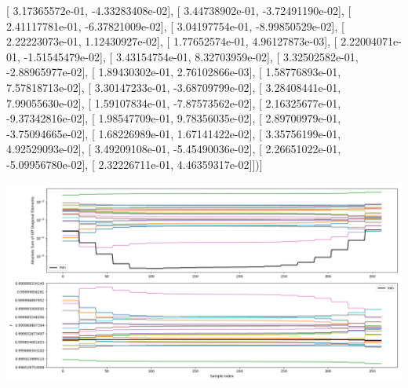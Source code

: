\documentclass{article}
\begin{document}
       [  3.17365572e-01,  -4.33283408e-02],
       [  3.44738902e-01,  -3.72491190e-02],
       [  2.41117781e-01,  -6.37821009e-02],
       [  3.04197754e-01,  -8.99850529e-02],
       [  2.22223073e-01,   1.12430927e-02],
       [  1.77652574e-01,   4.96127873e-03],
       [  2.22004071e-01,  -1.51545479e-02],
       [  3.43154754e-01,   8.32703959e-02],
       [  3.32502582e-01,  -2.88965977e-02],
       [  1.89430302e-01,   2.76102866e-03],
       [  1.58776893e-01,   7.57818713e-02],
       [  3.30147233e-01,  -3.68709799e-02],
       [  3.28408441e-01,   7.99055630e-02],
       [  1.59107834e-01,  -7.87573562e-02],
       [  2.16325677e-01,  -9.37342816e-02],
       [  1.98547709e-01,   9.78356035e-02],
       [  2.89700979e-01,  -3.75094665e-02],
       [  1.68226989e-01,   1.67141422e-02],
       [  3.35756199e-01,   4.92529093e-02],
       [  3.49209108e-01,  -5.45490036e-02],
       [  2.26651022e-01,  -5.09956780e-02],
       [  2.32226711e-01,   4.46359317e-02]])]
\begin{center}
\includegraphics[scale=.9]{report_pickled_controls238/control_dpn_all.png}

\end{center}
\end{document}
